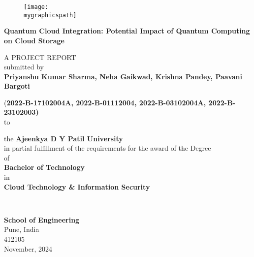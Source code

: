 \documentclass[12pt,a4paper]{article}
\newcommand{\mygraphicspath}{D:/SEM-5/FSDC/quantum-cloud-integration/images/ADYPU_LOGO.png}
\newcommand{\vname}{Priyanshu Kumar Sharma, Neha Gaikwad, Krishna Pandey, Paavani Bargoti}
\newcommand{\vregisternumber}{2022-B-17102004A, 2022-B-01112004, 2022-B-03102004A, 2022-B-23102003}
\newcommand{\vspecialization}{Cloud Technology \& Information Security}
\newcommand{\vdate}{November, 2024}
\newcommand{\vcollege}{Ajeenkya D Y Patil University}
\newcommand{\vtitle}{Quantum Cloud Integration: Potential Impact of Quantum Computing on Cloud Storage}
\newcommand{\department}{School of Engineering}
\newcommand{\vaddresslinei}{Pune, India}
\newcommand{\vaddresslineii}{412105}
\begin{document}
\thispagestyle{empty}
\begin{center}
    {\begin{figure}[!h]
        \centering
        \texttt{[image: \\mygraphicspath]}
    \end{figure}}


    {\large {\bfseries {\vtitle} \par}}


    \vspace{3\baselineskip}
    
    A PROJECT REPORT\\[0.5cm]
submitted by\\[0.5cm]
    {\fontsize{14}{20}\selectfont \bfseries \vname}

{(\bfseries \vregisternumber)}
\quad\\
to
\begin{spacing}{1.25}
the \textbf{\vcollege}\\

in partial fulfillment of the requirements for the award of the Degree\\
of\\
\textbf{Bachelor of Technology}\\
in\\
\textbf{\vspecialization}
\end{spacing}
%
\quad\\[0.5cm]

\begin{spacing}{1.25}
{\fontsize{14}{20}\selectfont\bfseries \department }\\

\vaddresslinei\\
\vaddresslineii\\
{\fontsize{12}{20}\selectfont \vdate}\\
\end{spacing}
\end{center}
\newpage
\end{document}
